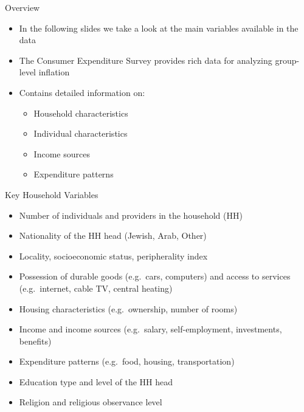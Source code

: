 \documentclass{beamer}
\begin{document}
\begin{frame}{Overview}
    \begin{itemize}
        \item In the following slides we take a look at the main variables available in the data
        \item The Consumer Expenditure Survey provides rich data for analyzing group-level inflation
        \item Contains detailed information on:
              \begin{itemize}
                  \item Household characteristics
                  \item Individual characteristics
                  \item Income sources
                  \item Expenditure patterns
              \end{itemize}
    \end{itemize}
\end{frame}

\begin{frame}{Key Household Variables}
    \begin{itemize}
        \item Number of individuals and providers in the household (HH)
        \item Nationality of the HH head (Jewish, Arab, Other)
        \item Locality, socioeconomic status, peripherality index
        \item Possession of durable goods (e.g.\ cars, computers) and access to services (e.g.\ internet, cable TV, central heating)
        \item Housing characteristics (e.g.\ ownership, number of rooms)
        \item Income and income sources (e.g.\ salary, self-employment, investments, benefits)
        \item Expenditure patterns (e.g.\ food, housing, transportation)
        \item Education type and level of the HH head
        \item Religion and religious observance level
    \end{itemize}
\end{frame}
\end{document}
